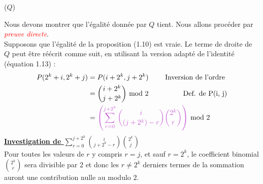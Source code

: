 \documentclass[16pt]{report}
\begin{document}
\begin{multicols*}{2}
\begin{prop}{($Q$)}{}
        \end{prop}
        \begin{Preuve*}{}{}
            Nous devons montrer que l'égalité donnée par $Q$ tient. Nous allons procéder 
            par \textcolor{red}{\textit{preuve directe}}. 
            \vspace{1em} \\ 
            Supposons que l'égalité de la proposition (1.10) est vraie. 
            Le terme de droite de $Q$ peut être réécrit comme suit, en utilisant 
            la version adapté de l'identité (équation 1.13) : 
            \begin{align*}
                P(2^k + i, 2^k + j)    &= P(i + 2^k, j + 2^k) 
                                \quad\quad\text{ Inversion de l'ordre } 
                                \\
                                &={i + 2^k \choose j + 2^k} \text{ mod } 2 \text{\;\quad\quad\quad\quad\; 
                Def.  de P(i, j)} 
                \\ 
                              &= \textcolor{myp}{\left( \sum_{r=0}^{j+2^k} 
                              {i \choose (j + 2^k)-r} {2^k \choose r} \right)}
                              \text{ mod } 2
            \end{align*} 
            \underline{\textbf{Investigation de $\sum_{r=0}^{j+2^k} {i \choose j + 2^k- r} {2^k \choose j}$}}
            \vspace{1em} \\ 
        Pour toutes les valeurs de $r$ y compris 
        $r = j$, et sauf $r= 2^k$, le coefficient binomial ${2^k \choose r}$ sera divisible 
        par $2$ et donc les $r \neq 2^k$ derniers termes de la sommation auront une contribution 
        nulle au modulo $2$. 


\end{Preuve*}
\end{multicols*}
\end{document}
